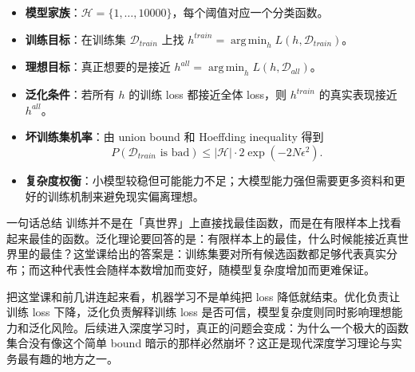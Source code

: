 \documentclass[a4paper]{article}
\DeclareMathOperator*{\argmin}{arg\,min}
\newcommand{\Dall}{\mathcal{D}_{all}}
\newcommand{\Dtrain}{\mathcal{D}_{train}}
\newcommand{\HH}{\mathcal{H}}
\begin{document}
\begin{itemize}
    \item \textbf{模型家族}：$\HH=\{1,\ldots,10000\}$，每个阈值对应一个分类函数。
    \item \textbf{训练目标}：在训练集 $\Dtrain$ 上找 $h^{train}=\argmin_h L(h,\Dtrain)$。
    \item \textbf{理想目标}：真正想要的是接近 $h^{all}=\argmin_h L(h,\Dall)$。
    \item \textbf{泛化条件}：若所有 $h$ 的训练 loss 都接近全体 loss，则 $h^{train}$ 的真实表现接近 $h^{all}$。
    \item \textbf{坏训练集机率}：由 union bound 和 Hoeffding inequality 得到
    \[
        P(\Dtrain\text{ is bad})
        \le
        |\HH|\cdot 2\exp(-2N\epsilon^2).
    \]
    \item \textbf{复杂度权衡}：小模型较稳但可能能力不足；大模型能力强但需要更多资料和更好的训练机制来避免现实偏离理想。
\end{itemize}

\begin{knowledgebox}{一句话总结}
    训练并不是在「真世界」上直接找最佳函数，而是在有限样本上找看起来最佳的函数。泛化理论要回答的是：有限样本上的最佳，什么时候能接近真世界里的最佳？这堂课给出的答案是：训练集要对所有候选函数都足够代表真实分布；而这种代表性会随样本数增加而变好，随模型复杂度增加而更难保证。
\end{knowledgebox}

把这堂课和前几讲连起来看，机器学习不是单纯把 loss 降低就结束。优化负责让训练 loss 下降，泛化负责解释训练 loss 是否可信，模型复杂度则同时影响理想能力和泛化风险。后续进入深度学习时，真正的问题会变成：为什么一个极大的函数集合没有像这个简单 bound 暗示的那样必然崩坏？这正是现代深度学习理论与实务最有趣的地方之一。
\end{document}
